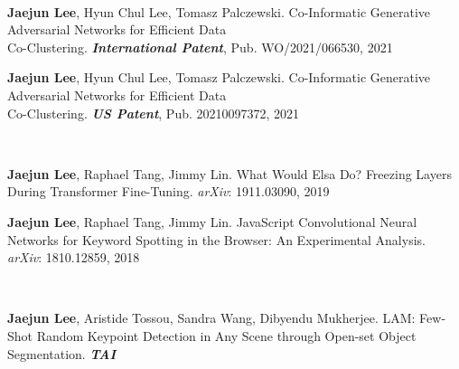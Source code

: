 \\
\begin{cvenumerate}[10]\vspace*{-0.15cm}
\item \hypertarget{CI-GAN:International}{\textcolor{gray!99!black}{\textbf{Jaejun Lee}}, Hyun Chul Lee, Tomasz Palczewski. Co-Informatic Generative Adversarial Networks for Efficient Data \\Co-Clustering. \textbf{\textit{International Patent}}, Pub. WO/2021/066530, 2021}
\item \hypertarget{CI-GAN:US}{\textcolor{gray!99!black}{\textbf{Jaejun Lee}}, Hyun Chul Lee, Tomasz Palczewski. Co-Informatic Generative Adversarial Networks for Efficient Data \\Co-Clustering. \textbf{\textit{US Patent}}, Pub. 20210097372, 2021}
\end{cvenumerate}
\hfill

\\
\begin{cvenumerate}[12]\vspace*{-0.15cm}
\item \hypertarget{Elsa:arXiv}{\textcolor{gray!99!black}{\textbf{Jaejun Lee}}, Raphael Tang, Jimmy Lin. What Would Elsa Do? Freezing Layers During Transformer Fine-Tuning. \textit{arXiv}: 1911.03090, 2019}
\item \hypertarget{JavaScript:arXiv}{\textcolor{gray!99!black}{\textbf{Jaejun Lee}}, Raphael Tang, Jimmy Lin. JavaScript Convolutional Neural Networks for Keyword Spotting in the Browser: An Experimental Analysis. \textit{arXiv}: 1810.12859, 2018}
\end{cvenumerate}
\hfill

\\
\begin{cvenumerate}[14]\vspace*{-0.15cm}
\item \hypertarget{LAM:TAI}{\textcolor{gray!99!black}{\textbf{Jaejun Lee}}, Aristide Tossou, Sandra Wang, Dibyendu Mukherjee. LAM: Few-Shot Random Keypoint Detection in Any Scene through Open-set
Object Segmentation. \textbf{\textit{TAI}}}
\end{cvenumerate}